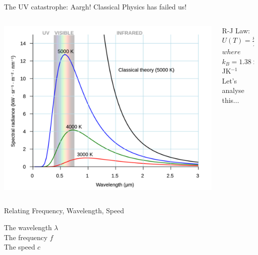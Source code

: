 \begin{frame}{The UV catastrophe: Aargh!}
\small
Classical Physics has failed us!
\begin{columns}
\begin{column}{0.6\textwidth}

\includegraphics[scale=0.3]{uvcatas}
\end{column}
\begin{column}{0.4\textwidth}
R-J Law: $U(T) = \frac{8\pi}{\lambda^4} k_B T$\\ [1ex]
$where$\\[1ex]
 $k_B = 1.38\times10^{-23}$ JK$^{-1}$\\[2ex]
Let's analyse this...\\[6ex]
\vspace{4cm}

\end{column}
\end{columns}


\end{frame}


\begin{frame}{Relating Frequency, Wavelength, Speed}
\small

The wavelength $\lambda$\\[1ex]
The frequency $f$\\[1ex]
The speed $c$\\[1ex]

\end{frame}


